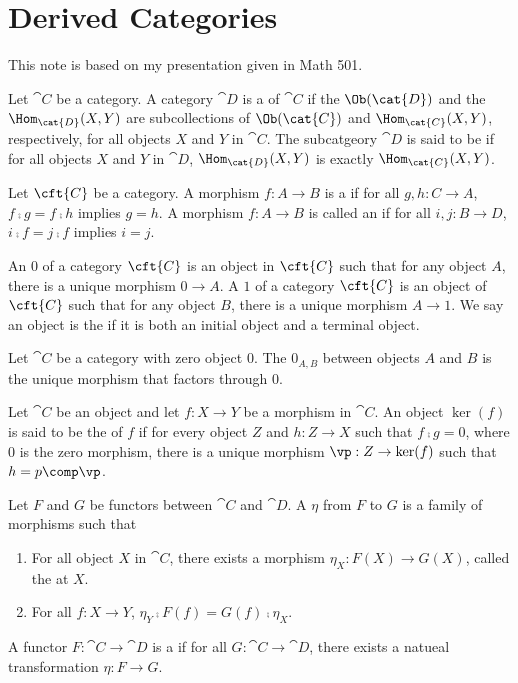 \section{Derived Categories}
\par
This note is based on my presentation given in Math 501.
\begin{definition}
    Let $\cat{C}$ be a category. A category $\cat{D}$ is a  of $\cat{C}$ if the $\Ob(\cat{D})$ and the ${\Hom}_{\cat{D}}(X,Y)$ are subcollections of $\Ob(\cat{C})$ and ${\Hom}_{\cat{C}}(X,Y)$, respectively, for all objects $X$ and $Y$ in $\cat{C}$. The subcatgeory $\cat{D}$ is said to be  if for all objects $X$ and $Y$ in $\cat{D}$, ${\Hom}_{\cat{D}}(X,Y)$ is exactly ${\Hom}_{\cat{C}}(X,Y)$.
\end{definition}
\begin{definition}
    Let $\cft{C}$ be a category. A morphism $f:A\to B$ is a  if for all $g,h:C\to A$, $f\comp g=f\comp h$ implies $g=h$. A morphism $f:A\to B$ is called an  if for all $i,j:B\to D$, $i\comp f=j\comp f$ implies $i=j$.
\end{definition}
\begin{definition}
    An  $0$ of a category $\cft{C}$ is an object in $\cft{C}$ such that for any object $A$, there is a unique morphism $0\to A$. A  $1$ of a category $\cft{C}$ is an object of $\cft{C}$ such that for any object $B$, there is a unique morphism $A\to 1$. We say an object is the  if it is both an initial object and a terminal object.
\end{definition}
\begin{definition}
    Let $\cat{C}$ be a category with zero object 0. The  ${0}_{A,B}$ between objects $A$ and $B$ is the unique morphism that factors through 0.
\end{definition}
\begin{definition}
    Let $\cat{C}$ be an object and let $f:X\to Y$ be a morphism in $\cat{C}$. An object $\ker(f)$ is said to be the  of $f$ if for every object $Z$ and $h:Z\to X$ such that $f\comp g=0$, where $0$ is the zero morphism, there is a unique morphism $\vp:Z\to\ker(f)$ such that $h=p\comp\vp$.
\end{definition}
\begin{definition}
    Let $F$ and $G$ be functors between $\cat{C}$ and $\cat{D}$. A  $\eta$ from $F$ to $G$ is a family of morphisms such that
    \begin{enumerate}
        \item For all object $X$ in $\cat{C}$, there exists a morphism ${\eta}_{X}:F(X)\to G(X)$, called the  at $X$.
        \item For all $f:X\to Y$, ${\eta}_{Y}\comp F(f)=G(f)\comp{\eta}_{X}$.
    \end{enumerate}
    A functor $F:\cat{C}\to\cat{D}$ is a  if for all $G:\cat{C}\to\cat{D}$, there exists a natueal transformation $\eta:F\to G$.
\end{definition}

